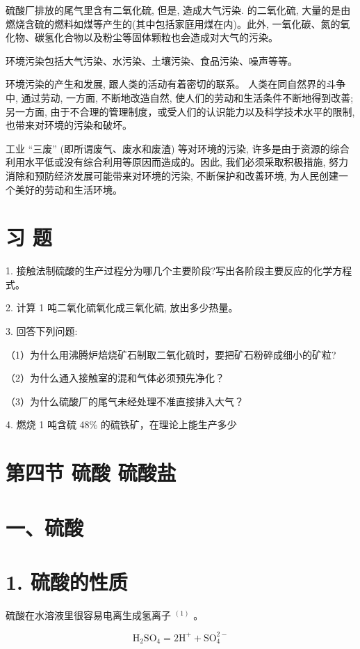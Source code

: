 \documentclass[10pt]{article}
\begin{document}
硫酸厂排放的尾气里含有二氧化硫, 但是, 造成大气污染. 的二氧化硫, 大量的是由燃烧含硫的燃料如煤等产生的(其中包括家庭用煤在内)。此外, 一氧化碳、氮的氧化物、碳氢化合物以及粉尘等固体颗粒也会造成对大气的污染。

环境污染包括大气污染、水污染、土壤污染、食品污染、噪声等等。

环境污染的产生和发展, 跟人类的活动有着密切的联系。 人类在同自然界的斗争中, 通过劳动, 一方面, 不断地改造自然, 使人们的劳动和生活条件不断地得到改善; 另一方面, 由于不合理的管理制度，或受人们的认识能力以及科学技术水平的限制, 也带来对环境的污染和破坏。

工业 “三废” (即所谓废气、废水和废渣) 等对环境的污染, 许多是由于资源的综合利用水平低或没有综合利用等原因而造成的。因此, 我们必须采取积极措施, 努力消除和预防经济发展可能带来对环境的污染, 不断保护和改善环境, 为人民创建一个美好的劳动和生活环境。

\section*{习 题}

1. 接触法制硫酸的生产过程分为哪几个主要阶段?写出各阶段主要反应的化学方程式。

2. 计算 1 吨二氧化硫氧化成三氧化硫, 放出多少热量。

3. 回答下列问题:

（1）为什么用沸腾炉焙烧矿石制取二氧化硫时，要把矿石粉碎成细小的矿粒?

（2）为什么通入接触室的混和气体必须预先净化？

（3）为什么硫酸厂的尾气未经处理不准直接排入大气？

4. 燃烧 1 吨含硫 48\% 的硫铁矿，在理论上能生产多少

\section*{第四节 硫酸 硫酸盐}

\section*{一、硫酸}

\section*{1. 硫酸的性质}

硫酸在水溶液里很容易电离生成氢离子 \({}^{\left( 1\right) }\) 。

\[
{\mathrm{H}}_{2}{\mathrm{{SO}}}_{4} = 2{\mathrm{H}}^{ + } + {\mathrm{{SO}}}_{4}^{2 - }
\]
\end{document}
